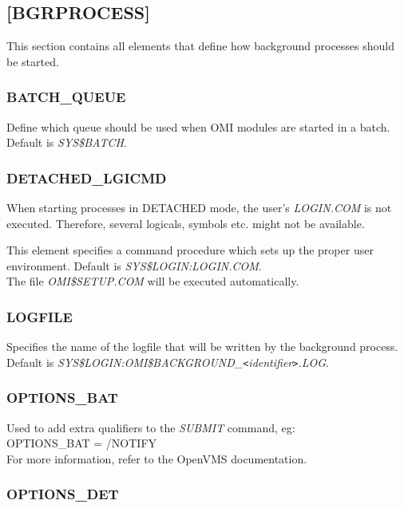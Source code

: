 \documentclass[a4paper]{book}
\newcommand{\lt}{\texttt{<}}
\newcommand{\gt}{\texttt{>}}
\renewcommand{\indent}{\hspace*{5mm}}
\begin{document}
\subsection{[BGRPROCESS]}
\label{subsubsec:mylabel19}

This section contains all elements that define how background processes 
should be started.

\subsubsection{BATCH{\_}QUEUE}

Define which queue should be used when OMI modules are started in a batch. 
Default is \textsl{SYS{\$}BATCH}.

\subsubsection{DETACHED{\_}LGICMD}

When starting processes in DETACHED mode, the user's \textsl{LOGIN.COM} is 
not executed. Therefore, several logicals, symbols etc. might not be 
available.

This element specifies a command procedure which sets up the proper user 
environment. Default is \textsl{SYS{\$}LOGIN:LOGIN.COM}. \\
The file \textsl{OMI{\$}SETUP.COM} will be executed automatically.

\subsubsection{LOGFILE}

Specifies the name of the logfile that will be written by the background 
process. Default is 
\textsl{SYS{\$}LOGIN:OMI{\$}BACKGROUND{\_}\textit{\lt identifier\gt }.LOG}.

\subsubsection{OPTIONS{\_}BAT}

Used to add extra qualifiers to the \textsl{SUBMIT} command, eg:\\
\indent\textsf{OPTIONS{\_}BAT = /NOTIFY} \\
For more information, refer to the OpenVMS documentation.

\subsubsection{OPTIONS{\_}DET}
\end{document}
